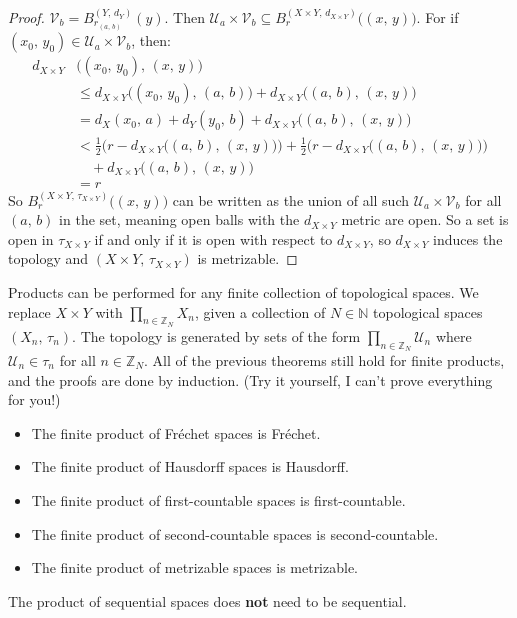 \documentclass{article}
\theoremstyle{plain}
\theoremstyle{normal}
\begin{document}
\begin{proof}
            $\mathcal{V}_{b}=B_{r_{(a,\,b)}}^{(Y,\,d_{Y})}(y)$. Then
            $\mathcal{U}_{a}\times\mathcal{V}_{b}\subseteq{B}_{r}^{(X\times{Y},\,d_{X\times{Y}})}\big((x,\,y)\big)$.
            For if $(x_{0},\,y_{0})\in\mathcal{U}_{a}\times\mathcal{V}_{b}$,
            then:
            \begin{align}
                d_{X\times{Y}}&\big((x_{0},\,y_{0}),\,(x,\,y)\big)
                \nonumber\\
                &\leq{d}_{X\times{Y}}\big((x_{0},\,y_{0}),\,(a,\,b)\big)
                    +d_{X\times{Y}}\big((a,\,b),\,(x,\,y)\big)\\
                &={d}_{X}(x_{0},\,a)+d_{Y}(y_{0},\,b)+
                    d_{X\times{Y}}\big((a,\,b),\,(x,\,y)\big)\\
                &<\frac{1}{2}\Big(
                    r-d_{X\times{Y}}\big((a,\,b),\,(x,\,y)\big)
                \Big)+\frac{1}{2}\Big(
                    r-d_{X\times{Y}}\big((a,\,b),\,(x,\,y)\big)
                \Big)\nonumber\\
                &\quad+d_{X\times{Y}}\big((a,\,b),\,(x,\,y)\big)\\
                &=r
            \end{align}
            So $B_{r}^{(X\times{Y},\,\tau_{X\times{Y}})}\big((x,\,y)\big)$
            can be written as the union of all such
            $\mathcal{U}_{a}\times\mathcal{V}_{b}$ for all
            $(a,\,b)$ in the set, meaning open balls with the
            $d_{X\times{Y}}$ metric are open. So a set is open in
            $\tau_{X\times{Y}}$ if and only if it is open with respect to
            $d_{X\times{Y}}$, so $d_{X\times{Y}}$ induces the topology and
            $(X\times{Y},\,\tau_{X\times{Y}})$ is metrizable.
        \end{proof}
        Products can be performed for any finite collection of topological
        spaces. We replace $X\times{Y}$ with
        $\prod_{n\in\mathbb{Z}_{N}}X_{n}$, given a collection of
        $N\in\mathbb{N}$ topological spaces $(X_{n},\,\tau_{n})$. The
        topology is generated by sets of the form
        $\prod_{n\in\mathbb{Z}_{N}}\mathcal{U}_{n}$ where
        $\mathcal{U}_{n}\in\tau_{n}$ for all $n\in\mathbb{Z}_{N}$. All of the
        previous theorems still hold for finite products, and the proofs are
        done by induction. (Try it yourself, I can't prove everything for you!)
        \begin{itemize}
            \item The finite product of Fr\'{e}chet spaces is Fr\'{e}chet.
            \item The finite product of Hausdorff spaces is Hausdorff.
            \item The finite product of first-countable spaces is
                first-countable.
            \item The finite product of second-countable spaces is
                second-countable.
            \item The finite product of metrizable spaces is metrizable.
        \end{itemize}
        The product of sequential spaces does \textbf{not} need to be
        sequential.
\end{document}
